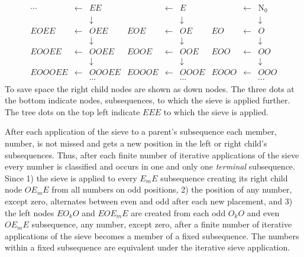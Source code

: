 \documentclass{article}
\begin{document}
\begin{displaymath}
\begin{array}{rrrrrrrrr}
\cdots&\gets&EE&&\gets&E&&\gets&\mathrm{N_0}\\
&&\downarrow&&&\downarrow&&&\downarrow\\
EOEE&\gets&OEE&EOE&\gets&OE&EO&\gets&O\\
&&\downarrow&&&\downarrow&&&\downarrow\\
EOOEE&\gets&OOEE&EOOE&\gets&OOE&EOO&\gets&OO\\
&&\downarrow&&&\downarrow&&&\downarrow\\
EOOOEE&\gets&OOOEE&EOOOE&\gets&OOOE&EOOO&\gets&OOO\\
&&\cdots&&&\cdots&&&\cdots
\end{array}
\end{displaymath}
To save space the right child nodes are shown as down nodes. The three dots at the bottom indicate nodes, subsequences, to which the sieve is applied further. The tree dots on the top left indicate $EEE$ to which the sieve is applied.

After each application of the sieve to a parent's subsequence each member, number, is not missed and gets a new position in the left or right child's subsequences. Thus, after each finite number of iterative applications of the sieve every number is classified and occurs in one and only one \textit{terminal} subsequence. Since 1) the sieve is applied to every $E_m{E}$ subsequence creating its right child node $OE_m{E}$ from all numbers on odd positions, 2) the position of any number, except zero, alternates between even and odd after each new placement, and 3) the left nodes $EO_k{O}$ and $EOE_m{E}$ are created from each odd $O_k{O}$ and even $OE_m{E}$ subsequence, any number, except zero, after a finite number of iterative applications of the sieve becomes a member of a fixed subsequence. The numbers within a fixed subsequence are equivalent under the iterative sieve application.
\end{document}
